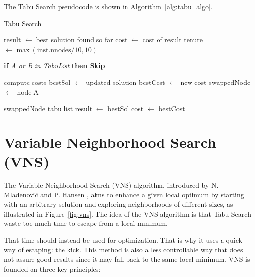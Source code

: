 \newpage

\noindent The Tabu Search pseudocode is shown in Algorithm~\ref{alg:tabu_algo}.

\begin{algorithm}
    \caption{Tabu Search}
    \label{alg:tabu_algo}
     \begin{spacing}{1.2} %
        \BlankLine
        result $\leftarrow$ best solution found so far\;
        cost $\leftarrow$ cost of result\;
        tenure $\leftarrow \max(\text{inst.nnodes} / 10, 10)$\;
        \BlankLine
        {
            {
                \textbf{if} \textit{A or B in TabuList} \textbf{then Skip}\;

                \BlankLine
                compute  costs\;
                {
                    bestSol $\leftarrow$ updated solution\;
                    bestCost $\leftarrow$ new cost\;
                    swappedNode $\leftarrow$ node A\;
                }
            }
            \BlankLine
            {
                 swappedNode \KwTo tabu list\;
            }
            \BlankLine
            result $\leftarrow$ bestSol\;
            cost $\leftarrow$ bestCost\;
        }
    \end{spacing}
\end{algorithm}

\section{Variable Neighborhood Search (VNS)}
The Variable Neighborhood Search (VNS) algorithm, introduced by N. Mladenović and P. Hansen \cite{MLADENOVIC19971097}, aims to enhance a given local optimum by starting with an arbitrary solution and exploring neighborhoods of different sizes, as illustrated in Figure~\ref{fig:vns}. 
The idea of the VNS algorithm is that Tabu Search waste too much time to escape from a local minimum. 

\newpage

\noindent That time should instead be used for optimization. That is why it uses a quick way of escaping: the kick. This method is also a less controllable way that does not assure good results since it may fall back to the same local minimum.
VNS is founded on three key principles:


